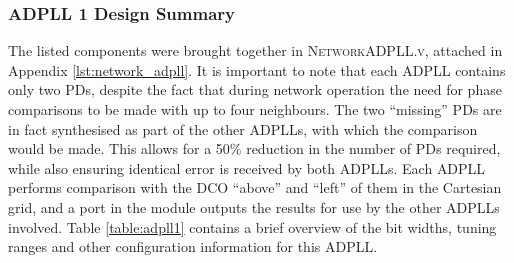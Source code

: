 \subsubsection{\acs{ADPLL} 1 Design Summary}
The listed components were brought together in \textsc{NetworkADPLL.v}, attached in Appendix \ref{lst:network_adpll}. It is important to note that each \ac{ADPLL} contains only two \aclp{PD}, despite the fact that during network operation the need for phase comparisons to be made with up to four neighbours. The two ``missing'' \acp{PD} are in fact synthesised as part of the other \acp{ADPLL}, with which the comparison would be made. This allows for a 50\% reduction in the number of \acp{PD} required, while also ensuring identical error is received by both \acp{ADPLL}. Each \ac{ADPLL} performs comparison with the \ac{DCO} ``above'' and ``left'' of them in the Cartesian grid, and a port in the module outputs the results for use by the other \acp{ADPLL} involved.
Table \ref{table:adpll1} contains a brief overview of the bit widths, tuning ranges and other configuration information for this \ac{ADPLL}.
